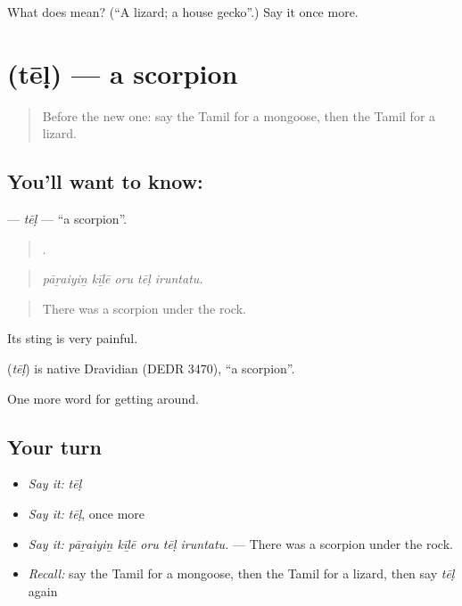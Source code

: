 \begin{tcolorbox}[breakable,colback=teal!4,colframe=teal!35!black,title={Before you move on}]
What does  mean? (\textquotedblleft{}A lizard; a house gecko\textquotedblright{}.) Say it once more.
\end{tcolorbox}
\section[\texorpdfstring{\ta{தேள்} (tēḷ)}{தேள் (tēḷ)}]{ (tēḷ) — a scorpion}

\label{lesson:TA-C438-tel}



\begin{quote}
Before the new one: say the Tamil for a mongoose, then the Tamil for a lizard.
\end{quote}

\subsection*{You'll want to know: }
\textbf{} — \emph{tēḷ} — \textquotedblleft{}a scorpion\textquotedblright{}.

\begin{quote}
    .
\end{quote}

\begin{quote}
\emph{pāṟaiyiṉ kīḻē oru tēḷ iruntatu.}
\end{quote}

\begin{quote}
There was a scorpion under the rock.
\end{quote}

Its sting is very painful.

\begin{cousinweb}
\textbf{} (\emph{tēḷ}) is native Dravidian (DEDR 3470), \textquotedblleft{}a scorpion\textquotedblright{}.
\end{cousinweb}

\begin{grammarlens}[title={What you've built}]
One more word for getting around.
\end{grammarlens}

\subsection*{Your turn}
\begin{itemize}
\raggedright
  \item \emph{Say it:} \emph{tēḷ}
  \item \emph{Say it:} \emph{tēḷ}, once more
  \item \emph{Say it:} \emph{pāṟaiyiṉ kīḻē oru tēḷ iruntatu.} — There was a scorpion under the rock.
  \item \emph{Recall:} say the Tamil for a mongoose, then the Tamil for a lizard, then say \emph{tēḷ} again
\end{itemize}

